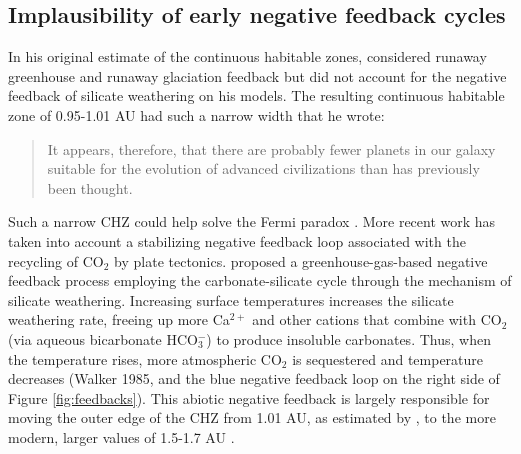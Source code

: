 \subsection{Implausibility of early negative feedback cycles}
\label{sec:silicateweathering}
In his original estimate of the continuous habitable zones, \citet{Hart1979} considered runaway greenhouse and runaway glaciation feedback but did not account for the negative feedback of silicate weathering on his models. The resulting continuous habitable zone of 0.95-1.01 AU had such a narrow width that he wrote:
\begin{quotation}
	It appears, therefore, that there are probably fewer planets in our galaxy suitable for the evolution of advanced civilizations than has previously been thought.
\end{quotation}

Such a narrow CHZ could help solve the Fermi paradox \citep[\eg,][Solution 36, p.158]{Webb2002}. More recent work has taken into account a stabilizing negative feedback loop associated with the recycling of CO$_2$ by plate tectonics. \citet{Walker1981} proposed a greenhouse-gas-based negative feedback process employing the carbonate-silicate cycle through the mechanism of silicate weathering. Increasing surface temperatures increases the silicate weathering rate, freeing up more Ca$^{2+}$ and other cations that combine with CO$_2$ (via aqueous bicarbonate HCO$_{3}^{-}$) to produce insoluble carbonates. Thus, when the temperature rises, more atmospheric CO$_2$ is sequestered and temperature decreases (Walker 1985, and the blue negative feedback loop on the right side of Figure \ref{fig:feedbacks}).
This abiotic negative feedback is largely responsible for moving the outer edge of the CHZ from 1.01 AU, as estimated by \citet{Hart1979}, to the more modern, larger values of 1.5-1.7 AU \citep[\eg,][]{Kasting1993a,Kopparapu2013}.

